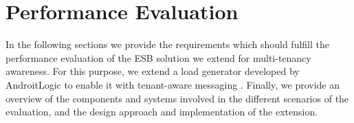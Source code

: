 \chapter{Performance Evaluation}
\label{chap:performanceevaluation}

In the following sections we provide the requirements which should fulfill the performance evaluation of the \ac{ESB} solution we extend for multi-tenancy awareness. For this purpose, we extend a load generator developed by AndroitLogic to enable it with tenant-aware messaging \cite{androit2012}. Finally, we provide an overview of the components and systems involved in the different scenarios of the evaluation, and the design approach and implementation of the extension.





